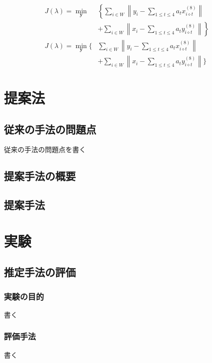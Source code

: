 \documentclass[dvipdfmx,disablejfam,nosetpagesize,12pt]{jsbook}
\begin{document}
\begin{align}
   J(\lambda) = \min_{\bm y}
   & \left\{
      \sum_{i\in W} \left\| y_i - \sum_{1\le t \le 4} a_t x_{i\diamond t}^{(8)} \right\|
   \right. \nonumber \\
   & \left.
      + \sum_{i\in W} \left\| x_i - \sum_{1\le t \le 4} a_t y_{i\diamond t}^{(8)} \right\|
   \right\}
   \\
   J(\lambda) = \min_{\bm y}
   \Biggl\{
   &   \sum_{i\in W} \left\| y_i - \sum_{1\le t \le 4} a_t x_{i\diamond t}^{(8)} \right\|
   \nonumber \\
   &   + \sum_{i\in W} \left\| x_i - \sum_{1\le t \le 4} a_t y_{i\diamond t}^{(8)} \right\|
   \Biggr\}
\end{align}



\chapter{提案法} \label{Chap.proposed}
\section{従来の手法の問題点} \label{Sec.problem}
従来の手法の問題点を書く

\section{提案手法の概要}
\section{提案手法}

\chapter{実験}
\section{推定手法の評価}
\subsection{実験の目的}
書く
\subsection{評価手法}
書く
\end{document}

